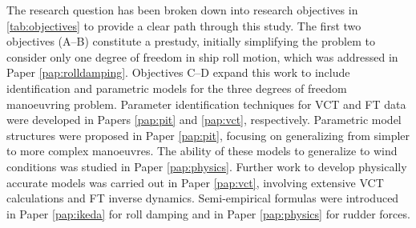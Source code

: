 \noindent The research question has been broken down into research objectives in \autoref{tab:objectives} to provide a clear path through this study. The first two objectives (A--B) constitute a prestudy, initially simplifying the problem to consider only one degree of freedom in ship roll motion, which was addressed in Paper \ref{pap:rolldamping}. Objectives C--D expand this work to include identification and parametric models for the three degrees of freedom manoeuvring problem. Parameter identification techniques for VCT and FT data were developed in Papers \ref{pap:pit} and \ref{pap:vct}, respectively. Parametric model structures were proposed in Paper \ref{pap:pit}, focusing on generalizing from simpler to more complex manoeuvres. The ability of these models to generalize to wind conditions was studied in Paper \ref{pap:physics}. Further work to develop physically accurate models was carried out in Paper \ref{pap:vct}, involving extensive VCT calculations and FT inverse dynamics. Semi-empirical formulas were introduced in Paper \ref{pap:ikeda} for roll damping and in Paper \ref{pap:physics} for rudder forces. 
%
%
%    
%    
%
%
%    

